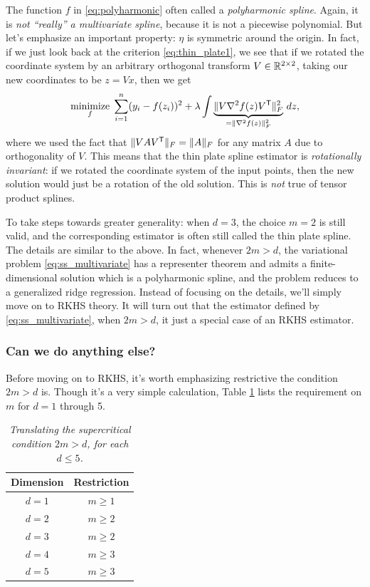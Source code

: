 \documentclass{article}
\begin{document}
The function $f$ in \eqref{eq:polyharmonic} often called a \emph{polyharmonic
  spline}. Again, it is \emph{not ``really'' a multivariate spline}, because it
is not a piecewise polynomial. But let's emphasize an important property: $\eta$
is symmetric around the origin. In fact, if we just look back at the criterion
\eqref{eq:thin_plate1}, we see that if we rotated the coordinate system by an
arbitrary orthogonal transform $V \in \mathbb{R}^{2 \times 2}$, taking our new
coordinates to be $z=Vx$, then we get 
\[
\mathop{\mathrm{minimize}}_f \; \sum_{i=1}^n (y_i - f(z_i))^2 + \lambda \int \underbrace{\| V
  \nabla^2 f(z) V^{\mathsf{T}}\|_F^2}_{= \|\nabla^2 f(z)\|_F^2} \, dz,   
\]
where we used the fact that $\|V A V^{\mathsf{T}}\|_F = \|A\|_F$ for any matrix $A$ due to
orthogonality of $V$. This means that the thin plate spline estimator is
\emph{rotationally invariant}: if we rotated the coordinate system of the input
points, then the new solution would just be a rotation of the old solution. This
is \emph{not} true of tensor product splines. 

To take steps towards greater generality: when $d=3$, the choice $m=2$ is still
valid, and the corresponding estimator is often still called the thin plate
spline. The details are similar to the above. In fact, whenever $2m > d$, the
variational problem \eqref{eq:ss_multivariate} has a representer theorem and
admits a finite-dimensional solution which is a polyharmonic spline, and the
problem reduces to a generalized ridge regression. Instead of focusing on the
details, we'll simply move on to RKHS theory. It will turn out that the
estimator defined by \eqref{eq:ss_multivariate}, when $2m > d$, it just a
special case of an RKHS estimator.

\subsubsection{Can we do anything else?}

Before moving on to RKHS, it's worth emphasizing restrictive the condition  
$2m > d$ is. Though it's a very simple calculation, Table
\ref{tab:supercritical} lists the requirement on $m$ for $d=1$ through 5.  

\begin{table}[htb]
\centering
\begin{tabular}{c|c}
Dimension & Restriction \\
\hline
$d=1$ & $m \geq 1$ \\
$d=2$ & $m \geq 2$ \\
$d=3$ & $m \geq 2$ \\
$d=4$ & $m \geq 3$ \\
$d=5$ & $m \geq 3$ 
\end{tabular}
\caption{\it Translating the supercritical condition $2m > d$, for each $d 
  \leq 5$.} 
\label{tab:supercritical} 
\end{table}
\end{document}
